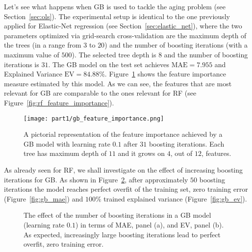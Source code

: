 	    Let's see what happens when GB is used to tackle the aging problem (see Section~\ref{sec:ols}).
	    The experimental setup is identical to the one previously applied for Elastic-Net regression (see Section~\ref{sec:elastic_net}), where the two parameters optimized via grid-search cross-validation are the maximum depth of the trees (in a range from $3$ to $20$) and the number of boosting iterations (with a maximum value of $500$).
	    The selected tree depth is $8$ and the number of boosting iterations is $31$.
		The GB model on the test set achieves $\text{MAE} = 7.955$ and Explained Variance $\text{EV} = 84.88\%$.
	    Figure~\ref{fig:gb_feature_importance} shows the feature importance measure estimated by this model.
	    As we can see, the features that are most relevant for GB are comparable to the ones relevant for RF (see Figure~\ref{fig:rf_feature_importance}).

	    \begin{figure}[]
	    \centering
	    \texttt{[image: part1/gb\_feature\_importance.png]}
    	\caption{A pictorial representation of the feature importance achieved by a GB model with learning rate $0.1$ after $31$ boosting iterations. Each tree has maximum depth of $11$ and it grows on $4$, out of $12$, features.} \label{fig:gb_feature_importance}
	    \end{figure}
   		

	    As already seen for RF, we shall investigate on the effect of increasing boosting iterations for GB. As shown in Figure~\ref{fig:gb_increasing}, after approximately $50$ boosting iterations the model reaches perfect overfit of the training set, \ie zero training error (Figure~\ref{fig:gb_mae}) and $100\%$ trained explained variance (Figure~\ref{fig:gb_ev}).

        \begin{figure}[]
    	\centering
    	\hfill%
    	\caption{The effect of the number of boosting iterations in a GB model (learning rate $0.1$) in terms of MAE, panel (a), and EV, panel (b). As expected, increasingly large boosting iterations lead to perfect overfit, \ie zero training error.}\label{fig:gb_increasing}
	    \end{figure}
	    


